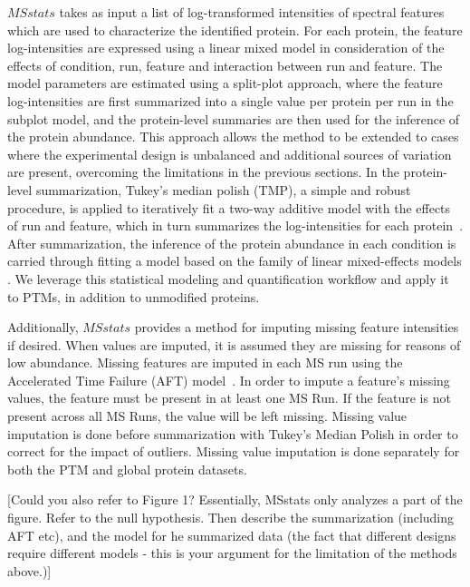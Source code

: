 \documentclass[mcp]{article}
\numberwithin{table}{section}
\def\todo#1{{\color{red}[#1]}}
\begin{document}
$MSstats$ takes as input a list of log-transformed intensities of spectral features which are used to characterize the identified protein. For each protein, the feature log-intensities are expressed using a linear mixed model in consideration of the effects of condition, run, feature and interaction between run and feature. The model parameters are estimated using a split-plot approach, where the feature log-intensities are first summarized into a single value per protein per run in the subplot model, and the protein-level summaries are then used for the inference of the protein abundance. This approach allows the method to be extended to cases where the experimental design is unbalanced and additional sources of variation are present, overcoming the limitations in the previous sections. In the protein-level summarization, Tukey's median polish (TMP), a simple and robust procedure, is applied to iteratively fit a two-way additive model with the effects of run and feature, which in turn summarizes the log-intensities for each protein~\cite{Tukey:1977}. After summarization, the inference of the protein abundance in each condition is carried through fitting a model based on the family of linear mixed-effects models \cite{Bolker2009} \cite{Faraway:2006}. We leverage this statistical modeling and quantification workflow and apply it to PTMs, in addition to unmodified proteins.

Additionally, $MSstats$ provides a method for imputing missing feature intensities if desired. When values are imputed, it is assumed they are missing for reasons of low abundance. Missing features are imputed in each MS run using the Accelerated Time Failure (AFT) model~\cite{Tukey:1977}. In order to impute a feature's missing values, the feature must be present in at least one MS Run. If the feature is not present across all MS Runs, the value will be left missing. Missing value imputation is done before summarization with Tukey's Median Polish in order to correct for the impact of outliers. Missing value imputation is done separately for both the PTM and global protein datasets.

\todo{Could you also refer to Figure 1? Essentially, MSstats only analyzes a part of the figure. Refer to the null hypothesis. Then describe the summarization (including AFT etc), and the model for he summarized data (the fact that different designs require different models - this is your argument for the limitation of the methods above.)}

\end{document}
